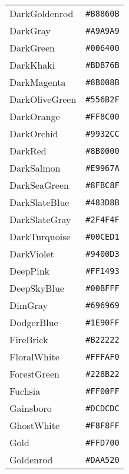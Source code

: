 \documentclass[a4paper]{article}
\begin{document}
\begin{longtable}{|l|r|}
DarkGoldenrod & \texttt{\#B8860B} \cellcolor[HTML]{B8860B} \\
DarkGray & \texttt{\#A9A9A9} \cellcolor[HTML]{A9A9A9} \\
DarkGreen & \texttt{\#006400} \cellcolor[HTML]{006400} \\
DarkKhaki & \texttt{\#BDB76B} \cellcolor[HTML]{BDB76B} \\
DarkMagenta & \texttt{\#8B008B} \cellcolor[HTML]{8B008B} \\
DarkOliveGreen & \texttt{\#556B2F} \cellcolor[HTML]{556B2F} \\
DarkOrange & \texttt{\#FF8C00} \cellcolor[HTML]{FF8C00} \\
DarkOrchid & \texttt{\#9932CC} \cellcolor[HTML]{9932CC} \\
DarkRed & \texttt{\#8B0000} \cellcolor[HTML]{8B0000} \\
DarkSalmon & \texttt{\#E9967A} \cellcolor[HTML]{E9967A} \\
DarkSeaGreen & \texttt{\#8FBC8F} \cellcolor[HTML]{8FBC8F} \\
DarkSlateBlue & \texttt{\#483D8B} \cellcolor[HTML]{483D8B} \\
DarkSlateGray & \texttt{\#2F4F4F} \cellcolor[HTML]{2F4F4F} \\
DarkTurquoise & \texttt{\#00CED1} \cellcolor[HTML]{00CED1} \\
DarkViolet & \texttt{\#9400D3} \cellcolor[HTML]{9400D3} \\
DeepPink & \texttt{\#FF1493} \cellcolor[HTML]{FF1493} \\
DeepSkyBlue & \texttt{\#00BFFF} \cellcolor[HTML]{00BFFF} \\
DimGray & \texttt{\#696969} \cellcolor[HTML]{696969} \\
DodgerBlue & \texttt{\#1E90FF} \cellcolor[HTML]{1E90FF} \\
FireBrick & \texttt{\#B22222} \cellcolor[HTML]{B22222} \\
FloralWhite & \texttt{\#FFFAF0} \cellcolor[HTML]{FFFAF0} \\
ForestGreen & \texttt{\#228B22} \cellcolor[HTML]{228B22} \\
Fuchsia & \texttt{\#FF00FF} \cellcolor[HTML]{FF00FF} \\
Gainsboro & \texttt{\#DCDCDC} \cellcolor[HTML]{DCDCDC} \\
GhostWhite & \texttt{\#F8F8FF} \cellcolor[HTML]{F8F8FF} \\
Gold & \texttt{\#FFD700} \cellcolor[HTML]{FFD700} \\
Goldenrod & \texttt{\#DAA520} \cellcolor[HTML]{DAA520} \\

\end{longtable}
\end{document}
